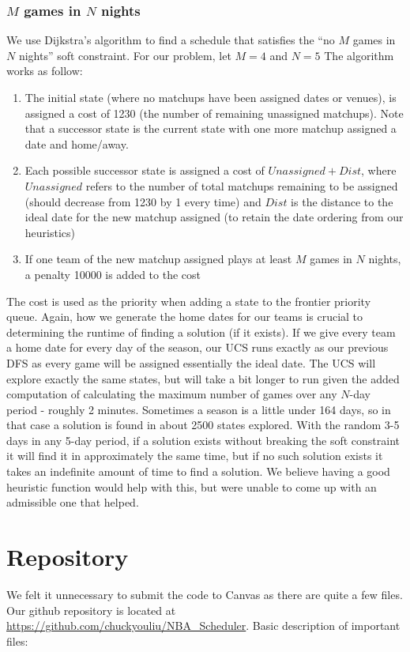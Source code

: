 \documentclass{article}
\begin{document}
	\subsubsection{$M$ games in $N$ nights}
	We use Dijkstra's algorithm to find a schedule that satisfies the ``no $M$ games in $N$ nights'' soft constraint. For our problem, let $M=4$ and $N=5$
    The algorithm works as follow:
    \begin{enumerate}
    	\item The initial state (where no matchups have been assigned dates or venues), is assigned a cost of 1230 (the number of remaining unassigned matchups). Note that a successor state is the current state with one more matchup assigned a date and home/away.
    	\item Each possible successor state is assigned a cost of $Unassigned + Dist$, where $Unassigned$ refers to the number of total matchups remaining to be assigned (should decrease from 1230 by 1 every time) and $Dist$ is the distance to the ideal date for the new matchup assigned (to retain the date ordering from our heuristics)
    	\item If one team of the new matchup assigned plays at least $M$ games in $N$ nights, a penalty 10000 is added to the cost
    \end{enumerate}
    The cost is used as the priority when adding a state to the frontier priority queue. Again, how we generate the home dates for our teams is crucial to determining the runtime of finding a solution (if it exists). If we give every team a home date for every day of the season, our UCS runs exactly as our previous DFS as every game will be assigned essentially the ideal date. The UCS will explore exactly the same states, but will take a bit longer to run given the added computation of calculating the maximum number of games over any $N$-day period - roughly 2 minutes. Sometimes a season is a little under 164 days, so in that case a solution is found in about 2500 states explored. With the random 3-5 days in any 5-day period, if a solution exists without breaking the soft constraint it will find it in approximately the same time, but if no such solution exists it takes an indefinite amount of time to find a solution. We believe having a good heuristic function would help with this, but were unable to come up with an admissible one that helped.

	\section{Repository}
	We felt it unnecessary to submit the code to Canvas as there are quite a few files. Our github repository is located at \url{https://github.com/chuckyouliu/NBA_Scheduler}. Basic description of important files:
\end{document}

